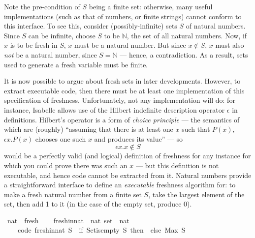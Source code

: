 Note the pre-condition of \(S\) being a finite set: otherwise, many useful implementations (such as that of numbers, or finite strings) cannot conform to this interface.
To see this, consider (possibly-infinite) sets \(S\) of natural numbers.
Since \(S\) can be infinite, choose \(S\) to be \(\mathbb{N}\), the set of all natural numbers.
Now, if \(x\) is to be fresh in \(S\), \(x\) must be a natural number.
But since \(x \notin S\), \(x\) must also \emph{not} be a natural number, since \(S = \mathbb{N}\) --- hence, a contradiction.
As a result, sets used to generate a fresh variable must be finite.

It is now possible to argue about fresh sets in later developments.
However, to extract executable code, then there must be at least one implementation of this specification of freshness.
Unfortunately, not any implementation will do: for instance, Isabelle allows use of the Hilbert indefinite description operator \(\epsilon\) in definitions.
Hilbert's operator is a form of \emph{choice principle} --- the semantics of which are (roughly) ``assuming that there is at least one \(x\) such that \(P(x)\), \(\epsilon x. P(x)\) chooses one such \(x\) and produces its value'' --- so
\[
\epsilon x. x \notin S
\]
would be a perfectly valid (and logical) definition of freshness for any instance for which you could prove there was such an \(x\) --- but this definition is not executable, and hence code cannot be extracted from it.
Natural numbers provide a straightforward interface to define an \emph{executable} freshness algorithm for: to make a fresh natural number from a finite set \(S\), take the largest element of the set, then add 1 to it (in the case of the empty set, produce 0).

\begin{implementation}
\isamarkupfalse%
\ nat\ {\isacharcolon}{\isacharcolon}\ fresh\isanewline
{}\isanewline
\ \ \isamarkupfalse%
\ fresh{\isacharunderscore}in{\isacharunderscore}nat\ {\isacharcolon}{\isacharcolon}\ {\isachardoublequoteopen}nat\ set\ {\isasymRightarrow}\ nat{\isachardoublequoteclose}\ \isanewline
\ \ \ \ {\isacharbrackleft}code{\isacharbrackright}{\isacharcolon}\ {\isachardoublequoteopen}fresh{\isacharunderscore}in{\isacharunderscore}nat\ S\ {\isasymequiv}\ {\isacharparenleft}if\ Set{\isachardot}is{\isacharunderscore}empty\ S\ then\ {}\ else\ Max\ S\ {\isacharplus}\ {}{\isacharparenright}{\isachardoublequoteclose}\isanewline
\end{implementation}

